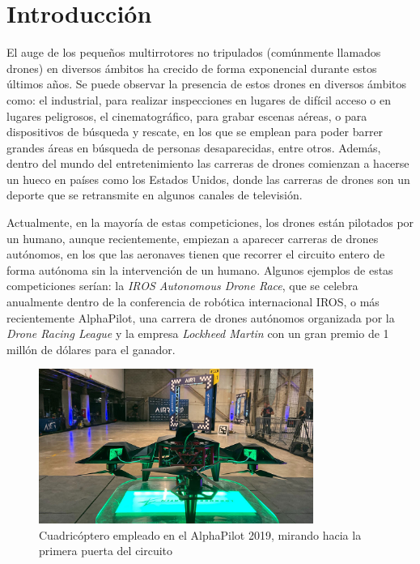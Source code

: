 \chapter{Introducción}


El auge de los pequeños multirrotores no tripulados (comúnmente llamados drones) en diversos ámbitos ha crecido de forma exponencial durante estos últimos años. Se puede observar la presencia de estos drones en diversos ámbitos como: el industrial, para realizar inspecciones en lugares de difícil acceso o en lugares peligrosos, el cinematográfico, para grabar escenas aéreas, o para dispositivos de búsqueda y rescate, en los que se emplean para poder barrer grandes áreas en búsqueda de personas desaparecidas, entre otros. Además, dentro del mundo del entretenimiento las carreras de drones comienzan a hacerse un hueco en países como los Estados Unidos, donde las carreras de drones son un deporte que se retransmite en algunos canales de televisión. 

Actualmente, en la mayoría de estas competiciones, los drones están pilotados por un humano, aunque recientemente, empiezan a aparecer carreras de drones autónomos, en los que las aeronaves tienen que recorrer el circuito entero de forma autónoma sin la intervención de un humano. Algunos ejemplos de estas competiciones serían: la \textit{IROS Autonomous Drone Race}, que se celebra anualmente dentro de la conferencia de robótica internacional  IROS, o más recientemente AlphaPilot, una carrera de drones autónomos organizada por la \textit{Drone Racing League} y la empresa \textit{Lockheed Martin} con un gran premio de 1 millón de dólares para el ganador.

\begin{figure}[htb!]
	\centering
	\includegraphics[width=0.80\textwidth]{imagenes/foehnAlphaPilot}
	\caption{Cuadricóptero empleado en el AlphaPilot 2019, mirando hacia la primera puerta del circuito \cite{foehn2020alphapilot}}
	\label{}
\end{figure}


